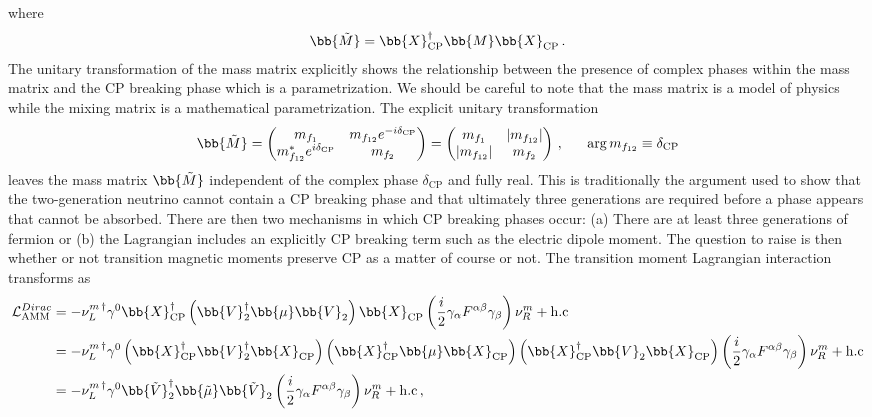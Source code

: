 where
\begin{alignat}{1}
	\label{cp:eq:05b} \bb{\tilde{M}}=\bb{X}_{\mathrm{CP}}^{\dagger}\bb{M}\bb{X}_{\mathrm{CP}}\,.
\end{alignat}
The unitary transformation of the mass matrix explicitly shows the relationship between the presence of complex phases within the mass matrix and the CP breaking phase which is a parametrization. We should be careful to note that the mass matrix is a model of physics while the mixing matrix is a mathematical parametrization. The explicit unitary transformation
\begin{alignat}{1}
	\label{cp:eq:05c} \bb{\tilde{M}} = 
	\begin{pmatrix}
		m_{f_{1}}&m_{f_{12}}e^{-i\delta_{\mathrm{CP}}}\\
		m_{f_{12}}^{*}e^{i\delta_{\mathrm{CP}}}&m_{f_{2}}
	\end{pmatrix}=
	\begin{pmatrix}
		m_{f_{1}}&|m_{f_{12}}|\\
		|m_{f_{12}}|&m_{f_{2}}
	\end{pmatrix}\,,\indent \arg{m_{f_{12}}}\equiv\delta_{\mathrm{CP}}
\end{alignat}
leaves the mass matrix $\bb{\tilde{M}}$ independent of the complex phase $\delta_{\mathrm{CP}}$ and fully real. This is traditionally the argument used to show that the two-generation neutrino cannot contain a CP breaking phase and that ultimately three generations are required before a phase appears that cannot be absorbed. There are then two mechanisms in which CP breaking phases occur: (a) There are at least three generations of fermion or (b) the Lagrangian includes an explicitly CP breaking term such as the electric dipole moment. The question to raise is then whether or not transition magnetic moments preserve CP as a matter of course or not. The transition moment Lagrangian interaction transforms as
\begin{alignat}{1}
	\notag \mathcal{L}_{\mathrm{AMM}}^{Dirac}&=-\nu_{L}^{m\, \dagger}\gamma^{0}\bb{X}_{\mathrm{CP}}^{\dagger}\left(\bb{V}^{\dagger}_{2}\bb{\mu}\bb{V}_{2}\right)\bb{X}_{\mathrm{CP}}\left(\frac{i}{2}\gamma_{\alpha}F^{\alpha\beta}\gamma_{\beta}\right)\nu_{R}^{m}+\mathrm{h.c}\\
	\notag &=-\nu_{L}^{m\, \dagger}\gamma^{0}\left(\bb{X}_{\mathrm{CP}}^{\dagger}\bb{V}^{\dagger}_{2}\bb{X}_{\mathrm{CP}}\right)\left(\bb{X}_{\mathrm{CP}}^{\dagger}\bb{\mu}\bb{X}_{\mathrm{CP}}\right)\left(\bb{X}_{\mathrm{CP}}^{\dagger}\bb{V}_{2}\bb{X}_{\mathrm{CP}}\right)\left(\frac{i}{2}\gamma_{\alpha}F^{\alpha\beta}\gamma_{\beta}\right)\nu_{R}^{m}+\mathrm{h.c}\\
	\label{cp:eq:06a} &=-\nu_{L}^{m\, \dagger}\gamma^{0}\bb{\tilde{V}}^{\dagger}_{2}\bb{\tilde{\mu}}\bb{\tilde{V}}_{2}\left(\frac{i}{2}\gamma_{\alpha}F^{\alpha\beta}\gamma_{\beta}\right)\nu_{R}^{m}+\mathrm{h.c}\,,
\end{alignat}
